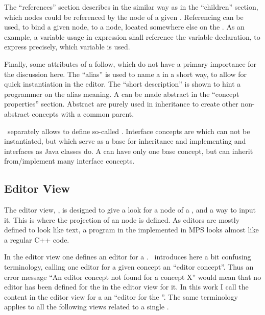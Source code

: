 The ``references'' section describes in the similar way as in the ``children'' section, which nodes could be referenced by the node of a given .
Referencing can be used, to bind a given node, to a node, located somewhere else on the . As an example, a variable usage in expression shall reference
the variable declaration, to express precisely, which variable is used.

Finally, some attributes of a  follow, which do not have a primary importance for the discussion here. The ``alias'' is used to 
name a  in a short way, to allow for quick instantiation in the editor. The ``short description'' is shown to hint a programmer on the
alias meaning. A  can be made abstract in the ``concept properties'' section. Abstract  are purely used in inheritance 
to create other non-abstract concepts with a common parent.

\jbmps\ separately allows to define so-called . Interface concepts are  which can not be instantiated, but 
which serve as a base for inheritance and implementing and interfaces as Java classes do. A  can have only one base concept, but can
inherit from/implement many interface concepts.

\subsection{Editor View}
\label{mpseditor}

The editor view, , is designed to give a look for a node of a , and a way to input it. This is where the projection of an  node is defined. 
As editors are mostly defined to look like text, a program in the \cpppl implemented in MPS looks almost like a regular C++ code.

In the editor view one defines an editor for a . \jbmps\ introduces here a bit confusing terminology, calling one editor for a given
 concept an ``editor concept''. Thus an error message ``An editor concept not found for a concept X'' would mean that no editor
has been defined for the   in the editor view for it. In this work I call the content in the editor view for a   an 
``editor for the  ''. The same terminology applies to all the following views related to a single .


